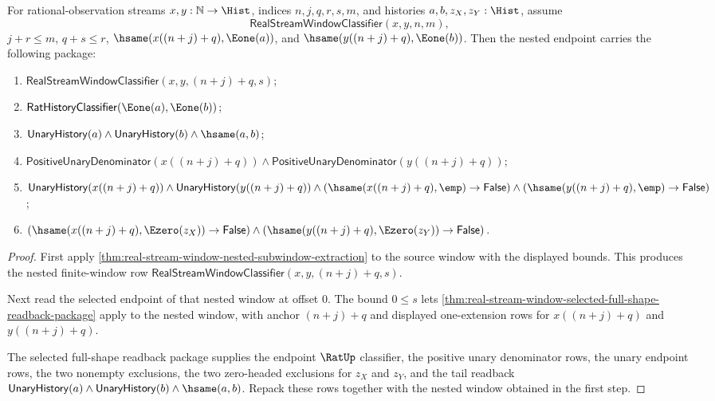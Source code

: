 \begin{theorem}
\label{thm:real-stream-window-nested-endpoint-package}
For rational-observation streams $x,y:\mathbb{N}\to\Hist$, indices
$n,j,q,r,s,m$, and histories $a,b,z_X,z_Y:\Hist$, assume
$$
\mathsf{RealStreamWindowClassifier}(x,y,n,m),
$$
$j+r\le m$, $q+s\le r$,
$\hsame(x((n+j)+q),\Eone(a))$, and
$\hsame(y((n+j)+q),\Eone(b))$. Then the nested endpoint carries the following
package:
\begin{enumerate}
\item $\mathsf{RealStreamWindowClassifier}(x,y,(n+j)+q,s)$;
\item $\mathsf{RatHistoryClassifier}(\Eone(a),\Eone(b))$;
\item $\mathsf{UnaryHistory}(a)\land\mathsf{UnaryHistory}(b)\land
\hsame(a,b)$;
\item $\mathsf{PositiveUnaryDenominator}(x((n+j)+q))\land
\mathsf{PositiveUnaryDenominator}(y((n+j)+q))$;
\item $\mathsf{UnaryHistory}(x((n+j)+q))\land
\mathsf{UnaryHistory}(y((n+j)+q))\land
(\hsame(x((n+j)+q),\emp)\to\mathsf{False})\land
(\hsame(y((n+j)+q),\emp)\to\mathsf{False})$;
\item $(\hsame(x((n+j)+q),\Ezero(z_X))\to\mathsf{False})\land
(\hsame(y((n+j)+q),\Ezero(z_Y))\to\mathsf{False})$.
\end{enumerate}
\end{theorem}
\begin{proof}
First apply
\autoref{thm:real-stream-window-nested-subwindow-extraction} to the source
window with the displayed bounds. This produces the nested finite-window row
$\mathsf{RealStreamWindowClassifier}(x,y,(n+j)+q,s)$.

Next read the selected endpoint of that nested window at offset $0$. The
bound $0\le s$ lets
\autoref{thm:real-stream-window-selected-full-shape-readback-package} apply
to the nested window, with anchor $(n+j)+q$ and displayed one-extension rows
for $x((n+j)+q)$ and $y((n+j)+q)$.

The selected full-shape readback package supplies the endpoint
$\RatUp$ classifier, the positive unary denominator rows, the unary endpoint
rows, the two nonempty exclusions, the two zero-headed exclusions for
$z_X$ and $z_Y$, and the tail readback
$\mathsf{UnaryHistory}(a)\land\mathsf{UnaryHistory}(b)\land\hsame(a,b)$.
Repack these rows together with the nested window obtained in the first step.
\end{proof}

